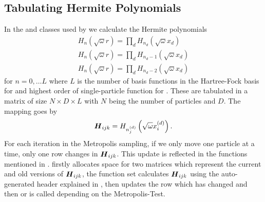 \subsection{Tabulating Hermite Polynomials}
    In the  and  classes
    used by  we calculate the Hermite polynomials
        \begin{equation}
            \begin{aligned}
                H_n(\sqrt{\omega}r) = \prod_d
                H_{n_d}\left(\sqrt{\omega}x_d\right) \\
                H_n(\sqrt{\omega}r) = \prod_d
                H_{n_d-1}\left(\sqrt{\omega}x_d\right) \\
                H_n(\sqrt{\omega}r) = \prod_d
                H_{n_d-2}\left(\sqrt{\omega}x_d\right)
            \end{aligned}
        \end{equation}
    for $n=0,\dots L$ where $L$ is the number of basis functions in the
    Hartree-Fock basis for  and highest order of
    single-particle function for . These are
    tabulated in a matrix of size $N\times D\times L$ with $N$ being the number
    of particles and $D$. The mapping goes by
        \begin{equation}
            \boldsymbol{{H}}_{ijk} = H_{n^{(d)}_j}\left(\sqrt{\omega}x^{(d)}_i\right).
        \end{equation}
    For each iteration in the Metropolis sampling, if we only move one particle
    at a time, only one row changes in $\boldsymbol{{H}}_{ijk}$. This update is
    reflected in the functions mentioned in .
     firstly allocates space for two matrices
    which represent the current and old versions of $\boldsymbol{{H}}_{ijk}$, the
     function set calculates $\boldsymbol{{H}}_{ijk}$ using the
    auto-generated header explained in ,
     then updates the row which has changed and then
     or  is called depending on the
    Metropolis-Test.

